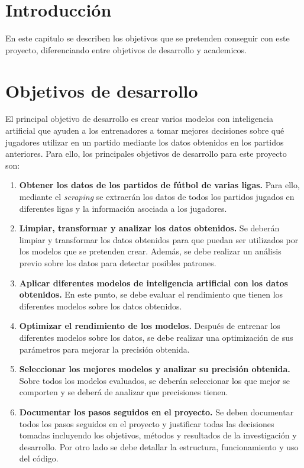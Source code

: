 
\section{Introducción}
En este capitulo se describen los objetivos que se pretenden conseguir con este proyecto, diferenciando entre objetivos de desarrollo y academicos.








\section{Objetivos de desarrollo}

\label{sec:desarrollo}
El principal objetivo de desarrollo es crear varios modelos con inteligencia artificial que ayuden a los entrenadores a tomar mejores decisiones sobre qué jugadores utilizar en un partido mediante los datos obtenidos en los partidos anteriores. Para ello, los principales objetivos de desarrollo para este proyecto son:
 \begin{enumerate}

    \item \textbf{Obtener los datos de los partidos de fútbol de varias ligas.}
    Para ello, mediante el \textit{scraping} se extraerán los datos de todos los partidos jugados en diferentes ligas y la información asociada a los jugadores.
    
    \item \textbf{Limpiar, transformar y analizar los datos obtenidos.}
    Se deberán limpiar y transformar los datos obtenidos para que puedan ser utilizados por los modelos que se pretenden crear. Además, se debe realizar un análisis previo sobre los datos para detectar posibles patrones.
    
    \item \textbf{Aplicar diferentes modelos de inteligencia artificial con los datos obtenidos.}
    En este punto, se debe evaluar el rendimiento que tienen los diferentes modelos sobre los datos obtenidos.

    \item \textbf{Optimizar el rendimiento de los modelos.}
    Después de entrenar los diferentes modelos sobre los datos, se debe realizar una optimización de sus parámetros para mejorar la precisión obtenida.

    \item \textbf{Seleccionar los mejores modelos y analizar su precisión obtenida.}
    Sobre todos los modelos evaluados, se deberán seleccionar los que mejor se comporten y se deberá de analizar que precisiones tienen.

    \item \textbf{Documentar los pasos seguidos en el proyecto.}
    Se deben documentar todos los pasos seguidos en el proyecto y justificar todas las decisiones tomadas incluyendo los objetivos, métodos y resultados de la investigación y desarrollo. Por otro lado se debe detallar la estructura, funcionamiento y uso del código.

 \end{enumerate}

